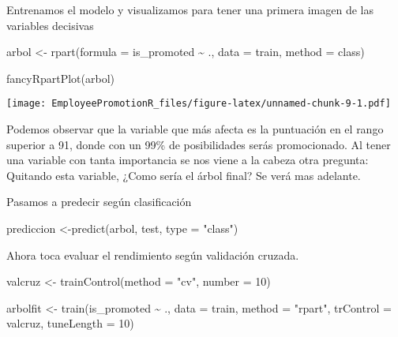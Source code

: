 \documentclass[
]{article}
\newenvironment{Shaded}{\begin{snugshade}}{\end{snugshade}}
\newcommand{\AttributeTok}[1]{\textcolor[rgb]{0.77,0.63,0.00}{#1}}
\newcommand{\DecValTok}[1]{\textcolor[rgb]{0.00,0.00,0.81}{#1}}
\newcommand{\FunctionTok}[1]{\textcolor[rgb]{0.00,0.00,0.00}{#1}}
\newcommand{\NormalTok}[1]{#1}
\newcommand{\OtherTok}[1]{\textcolor[rgb]{0.56,0.35,0.01}{#1}}
\newcommand{\SpecialCharTok}[1]{\textcolor[rgb]{0.00,0.00,0.00}{#1}}
\newcommand{\StringTok}[1]{\textcolor[rgb]{0.31,0.60,0.02}{#1}}
\begin{document}
Entrenamos el modelo y visualizamos para tener una primera imagen de las
variables decisivas

\begin{Shaded}
\begin{Highlighting}[]
\NormalTok{arbol }\OtherTok{\textless{}{-}} \FunctionTok{rpart}\NormalTok{(}\AttributeTok{formula =}\NormalTok{  is\_promoted  }\SpecialCharTok{\textasciitilde{}}\NormalTok{ ., }\AttributeTok{data =}\NormalTok{ train, }\AttributeTok{method =} \StringTok{\textquotesingle{}class\textquotesingle{}}\NormalTok{)}

\FunctionTok{fancyRpartPlot}\NormalTok{(arbol)}
\end{Highlighting}
\end{Shaded}

\texttt{[image: EmployeePromotionR\_files/figure-latex/unnamed-chunk-9-1.pdf]}

Podemos observar que la variable que más afecta es la puntuación en el
rango superior a 91, donde con un 99\% de posibilidades serás
promocionado. Al tener una variable con tanta importancia se nos viene a
la cabeza otra pregunta: Quitando esta variable, ¿Como sería el árbol
final? Se verá mas adelante.

Pasamos a predecir según clasificación

\begin{Shaded}
\begin{Highlighting}[]
\NormalTok{prediccion }\OtherTok{\textless{}{-}}\FunctionTok{predict}\NormalTok{(arbol, test, }\AttributeTok{type =} \StringTok{"class"}\NormalTok{)}
\end{Highlighting}
\end{Shaded}

Ahora toca evaluar el rendimiento según validación cruzada.

\begin{Shaded}
\begin{Highlighting}[]
\NormalTok{valcruz }\OtherTok{\textless{}{-}} \FunctionTok{trainControl}\NormalTok{(}\AttributeTok{method =} \StringTok{"cv"}\NormalTok{, }\AttributeTok{number =} \DecValTok{10}\NormalTok{)}

\NormalTok{arbolfit }\OtherTok{\textless{}{-}} \FunctionTok{train}\NormalTok{(is\_promoted }\SpecialCharTok{\textasciitilde{}}\NormalTok{ ., }\AttributeTok{data =}\NormalTok{ train, }\AttributeTok{method =} \StringTok{"rpart"}\NormalTok{,}
                 \AttributeTok{trControl =}\NormalTok{ valcruz, }\AttributeTok{tuneLength =} \DecValTok{10}\NormalTok{)}
\end{Highlighting}
\end{Shaded}
\end{document}
